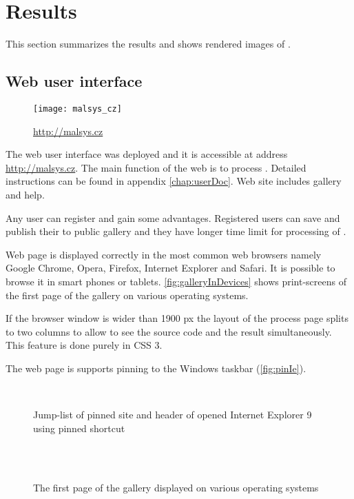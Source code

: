 
\chapter{Results}

This section summarizes the results and shows rendered images of \lsystems.


\section{Web user interface}

\begin{wrapfigure}{r}{0.4\textwidth}
	\texttt{[image: malsys\_cz]}
	\caption{\url{http://malsys.cz}}
	\label{fig:malsysQr}
\end{wrapfigure}

The web user interface was deployed and it is accessible at address \url{http://malsys.cz}.
The main function of the web is to process \lsystems.
Detailed instructions can be found in appendix \ref{chap:userDoc}.
Web site includes \lsystem gallery and help.

Any user can register and gain some advantages.
Registered users can save and publish their \lsystems to public gallery and they have longer time limit for processing of \lsystems.

Web page is displayed correctly in the most common web browsers namely Google Chrome, Opera, Firefox, Internet Explorer and Safari.
It is possible to browse it in smart phones or tablets.
\autoref{fig:galleryInDevices} shows print-screens of the first page of the gallery on various operating systems.

If the browser window is wider than 1900 px the layout of the \lsystem process page splits to two columns to allow to see the source code and the result simultaneously.
This feature is done purely in CSS 3.

The web page is supports pinning to the Windows taskbar (\autoref{fig:pinIe}). 

\begin{figure}[h]
	\centering
	 ~
	\caption{Jump-list of pinned site and header of opened Internet Explorer 9 using pinned shortcut}
	\label{fig:galleryInDevices}
\end{figure}


\begin{figure}[p]
	\centering
	\\
	 ~
	 ~
	\caption{The first page of the gallery displayed on various operating systems}
	\label{fig:pinIe}
\end{figure}


